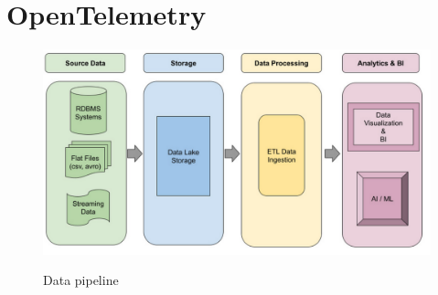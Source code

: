 \documentclass[aspectratio=169]{beamer}
\begin{document}
%	
%		
%	
%	
	{
		\section{OpenTelemetry}
	}
	
	
	\begin{frame}
		\begin{figure}
			\centering
			\includegraphics[width=0.8\linewidth]{Images/datalake}
			\label{fig:datalake}
			\caption{Data pipeline}
		\end{figure}
	\end{frame}
	
\end{document}
